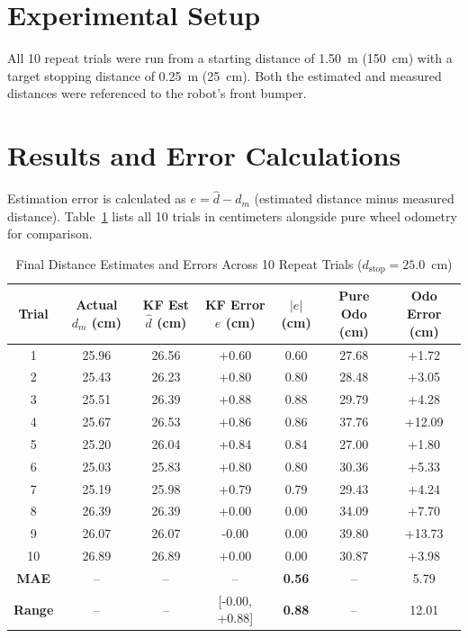 \documentclass[10pt,a4paper]{article}
\begin{document}
\section{Experimental Setup}
All 10 repeat trials were run from a starting distance of 1.50~m (150~cm) with a target stopping distance of 0.25~m (25~cm). Both the estimated and measured distances were referenced to the robot's front bumper.

\section{Results and Error Calculations}
Estimation error is calculated as $e = \hat{d} - d_m$ (estimated distance minus measured distance). Table~\ref{tab:results} lists all 10 trials in centimeters alongside pure wheel odometry for comparison.

\begin{table}[H]
\centering
\caption{Final Distance Estimates and Errors Across 10 Repeat Trials ($d_{\text{stop}} = 25.0$~cm)}
\label{tab:results}
\small
\begin{tabular}{ccccccc}
\toprule
\textbf{Trial} & \textbf{Actual $d_m$ (cm)} & \textbf{KF Est $\hat{d}$ (cm)} & \textbf{KF Error $e$ (cm)} & \textbf{$|e|$ (cm)} & \textbf{Pure Odo (cm)} & \textbf{Odo Error (cm)} \\
\midrule
1 & 25.96 & 26.56 & +0.60 & 0.60 & 27.68 & +1.72 \\
2 & 25.43 & 26.23 & +0.80 & 0.80 & 28.48 & +3.05 \\
3 & 25.51 & 26.39 & +0.88 & 0.88 & 29.79 & +4.28 \\
4 & 25.67 & 26.53 & +0.86 & 0.86 & 37.76 & +12.09 \\
5 & 25.20 & 26.04 & +0.84 & 0.84 & 27.00 & +1.80 \\
6 & 25.03 & 25.83 & +0.80 & 0.80 & 30.36 & +5.33 \\
7 & 25.19 & 25.98 & +0.79 & 0.79 & 29.43 & +4.24 \\
8 & 26.39 & 26.39 & +0.00 & 0.00 & 34.09 & +7.70 \\
9 & 26.07 & 26.07 & -0.00 & 0.00 & 39.80 & +13.73 \\
10 & 26.89 & 26.89 & +0.00 & 0.00 & 30.87 & +3.98 \\
\midrule
\textbf{MAE} & -- & -- & -- & \textbf{0.56} & -- & 5.79 \\
\textbf{Range} & -- & -- & [-0.00, +0.88] & \textbf{0.88} & -- & 12.01 \\
\bottomrule
\end{tabular}
\end{table}
\end{document}
